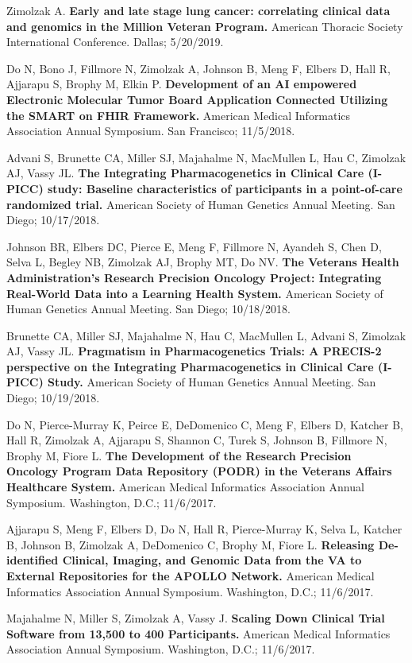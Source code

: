 \documentclass[10pt]{article}
\begin{document}
Zimolzak A. \textbf{Early and late stage lung cancer: correlating
  clinical data and genomics in the Million Veteran Program.} American
Thoracic Society International Conference. Dallas; 5/20/2019.

Do N, Bono J, Fillmore N, Zimolzak A, Johnson B, Meng F, Elbers D,
Hall R, Ajjarapu S, Brophy M, Elkin P. \textbf{Development of an AI
  empowered Electronic Molecular Tumor Board Application Connected
  Utilizing the SMART on FHIR Framework.} American Medical Informatics
Association Annual Symposium. San Francisco; 11/5/2018.

Advani S, Brunette CA, Miller SJ, Majahalme N, MacMullen L, Hau C,
Zimolzak AJ, Vassy JL. \textbf{The Integrating Pharmacogenetics in
  Clinical Care (I-PICC) study: Baseline characteristics of
  participants in a point-of-care randomized trial.} American Society
of Human Genetics Annual Meeting. San Diego; 10/17/2018.

Johnson BR, Elbers DC, Pierce E, Meng F, Fillmore N, Ayandeh S, Chen
D, Selva L, Begley NB, Zimolzak AJ, Brophy MT, Do NV. \textbf{The
  Veterans Health Administration's Research Precision Oncology
  Project: Integrating Real-World Data into a Learning Health System.}
American Society of Human Genetics Annual Meeting. San Diego;
10/18/2018.

Brunette CA, Miller SJ, Majahalme N, Hau C, MacMullen L, Advani S,
Zimolzak AJ, Vassy JL. \textbf{Pragmatism in Pharmacogenetics Trials:
  A PRECIS-2 perspective on the Integrating Pharmacogenetics in
  Clinical Care (I-PICC) Study.} American Society of Human Genetics
Annual Meeting. San Diego; 10/19/2018.

Do N, Pierce-Murray K, Peirce E, DeDomenico C, Meng F, Elbers D,
Katcher B, Hall R, Zimolzak A, Ajjarapu S, Shannon C, Turek S, Johnson
B, Fillmore N, Brophy M, Fiore L. \textbf{The Development of the
  Research Precision Oncology Program Data Repository (PODR) in the
  Veterans Affairs Healthcare System.} American Medical Informatics
Association Annual Symposium. Washington, D.C.; 11/6/2017.

Ajjarapu S, Meng F, Elbers D, Do N, Hall R, Pierce-Murray K, Selva L,
Katcher B, Johnson B, Zimolzak A, DeDomenico C, Brophy M, Fiore L.
\textbf{Releasing De-identified Clinical, Imaging, and Genomic Data
  from the VA to External Repositories for the APOLLO Network.}
American Medical Informatics Association Annual Symposium. Washington,
D.C.; 11/6/2017.

Majahalme N, Miller S, Zimolzak A, Vassy J. \textbf{Scaling Down
  Clinical Trial Software from 13,500 to 400 Participants.} American
Medical Informatics Association Annual Symposium. Washington, D.C.;
11/6/2017.
\end{document}

